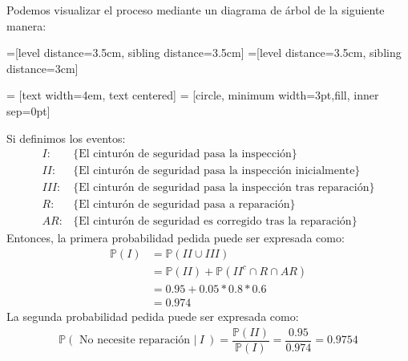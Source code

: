 \begin{solution}
Podemos visualizar el proceso mediante un diagrama de árbol de la siguiente manera:
\begin{center}
=[level distance=3.5cm, sibling distance=3.5cm]
=[level distance=3.5cm, sibling distance=3cm]

 = [text width=4em, text centered]
 = [circle, minimum width=3pt,fill, inner sep=0pt]

\end{center}
Si definimos los eventos:
\begin{align*}
I:&\{\text{El cinturón de seguridad pasa la inspección}\} \\
II:&\{\text{El cinturón de seguridad pasa la inspección inicialmente}\} \\
III:&\{\text{El cinturón de seguridad pasa la inspección tras reparación}\} \\
R:&\{\text{El cinturón de seguridad pasa a reparación}\}\\
AR:&\{\text{El cinturón de seguridad es corregido tras la reparación}\}
\end{align*}
Entonces, la primera probabilidad pedida puede ser expresada como:
\begin{align*}
\mathbb{P}(I)&=\mathbb{P}( II \cup III)\\
&= \mathbb{P}(II) + \mathbb{P}( II^c \cap R \cap AR)\\
&= 0.95 + 0.05*0.8*0.6\\
&= 0.974
\end{align*}
La segunda probabilidad pedida puede ser expresada como:
\begin{align*}
\mathbb{P}(\text{ No necesite reparación }| \ I \ )= \dfrac{\mathbb{P}(II)}{\mathbb{P}(I)}=\dfrac{0.95}{0.974}=0.9754
\end{align*}
\end{solution}